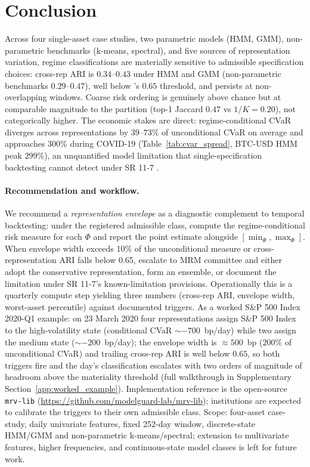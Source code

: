 \documentclass[preprint,12pt,authoryear]{elsarticle}
\newcommand{\SPX}{S\&P 500 Index}
\begin{document}
\section{Conclusion}
\label{sec:conclusion}

Across four single-asset case studies, two parametric models (HMM, GMM), non-parametric benchmarks (k-means, spectral), and five sources of representation variation, regime classifications are materially sensitive to admissible specification choices: cross-rep ARI is $0.34$--$0.43$ under HMM and GMM (non-parametric benchmarks $0.29$--$0.47$), well below \citet{Steinley2004}'s $0.65$ threshold, and persists at non-overlapping windows. Coarse risk ordering is genuinely above chance but at comparable magnitude to the partition (top-1 Jaccard $0.47$ vs $1/K=0.20$), not categorically higher. The economic stakes are direct: regime-conditional CVaR diverges across representations by $39$--$73\%$ of unconditional CVaR on average and approaches $300\%$ during COVID-19 (Table~\ref{tab:cvar_spread}, BTC-USD HMM peak $299\%$), an unquantified model limitation that single-specification backtesting cannot detect under SR 11-7 \citep{SR117}.

\paragraph{Recommendation and workflow.}
We recommend a \emph{representation envelope} as a diagnostic complement to temporal backtesting: under the registered admissible class, compute the regime-conditional risk measure for each $\Phi$ and report the point estimate alongside $[\min_\Phi, \max_\Phi]$. When envelope width exceeds 10\% of the unconditional measure or cross-representation ARI falls below 0.65, escalate to MRM committee and either adopt the conservative representation, form an ensemble, or document the limitation under SR 11-7's known-limitation provisions. Operationally this is a quarterly compute step yielding three numbers (cross-rep ARI, envelope width, worst-asset percentile) against documented triggers. As a worked \SPX{} 2020-Q1 example: on 23 March 2020 four representations assign \SPX{} to the high-volatility state (conditional CVaR ${\sim}{-}700$~bp/day) while two assign the medium state (${\sim}{-}200$~bp/day); the envelope width is ${\approx}500$~bp ($200\%$ of unconditional CVaR) and trailing cross-rep ARI is well below $0.65$, so both triggers fire and the day's classification escalates with two orders of magnitude of headroom above the materiality threshold (full walkthrough in Supplementary Section~\ref{app:worked_example}). Implementation reference is the open-source \texttt{mrv-lib} (\url{https://github.com/modelguard-lab/mrv-lib}); institutions are expected to calibrate the triggers to their own admissible class. Scope: four-asset case-study, daily univariate features, fixed 252-day window, discrete-state HMM/GMM and non-parametric k-means/spectral; extension to multivariate features, higher frequencies, and continuous-state model classes is left for future work.
\end{document}
